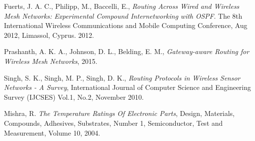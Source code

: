 \documentclass[conference]{IEEEtran}
\begin{document}
\begin{thebibliography}{1}
Fuerts, J. A. C., Philipp, M., Baccelli, E., \emph{Routing Across Wired
and Wireless Mesh Networks: Experimental Compound Internetworking with OSPF}. The 8th International Wireless Communications and Mobile Computing Conference, Aug 2012, Limassol, Cyprus. 2012.

Prashanth, A. K. A., Johnson, D. L., Belding, E. M., \emph{Gateway-aware Routing for Wireless Mesh Networks}, 2015.

Singh, S. K., Singh, M. P., Singh, D. K., \emph{Routing Protocols in Wireless Sensor Networks - A Survey}, International Journal of Computer Science and Engineering Survey (IJCSES) Vol.1, No.2, November 2010.

Mishra, R. \emph{The Temperature Ratings Of Electronic Parts}, Design, Materials, Compounds, Adhesives, Substrates, Number 1, Semiconductor, Test and Measurement, Volume 10, 2004.

\end{thebibliography}
\end{document}
